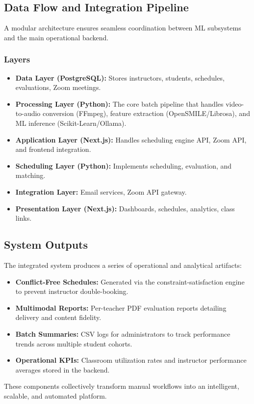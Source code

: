 \subsection{Data Flow and Integration Pipeline}

A modular architecture ensures seamless coordination between ML subsystems and the main operational backend.

\subsubsection*{Layers}
\begin{itemize}
    \item \textbf{Data Layer (PostgreSQL):} Stores instructors, students, schedules, evaluations, Zoom meetings.
    \item \textbf{Processing Layer (Python):} The core batch pipeline that handles video-to-audio conversion (FFmpeg), feature extraction (OpenSMILE/Librosa), and ML inference (Scikit-Learn/Ollama).
    \item \textbf{Application Layer (Next.js):}  
    Handles scheduling engine API, Zoom API, and frontend integration.
    \item \textbf{Scheduling Layer (Python):}  
    Implements scheduling, evaluation, and matching.
    \item \textbf{Integration Layer:}  
    Email services, Zoom API gateway.
    \item \textbf{Presentation Layer (Next.js):}  
    Dashboards, schedules, analytics, class links.
\end{itemize}

\subsection{System Outputs}
The integrated system produces a series of operational and analytical artifacts:
\begin{itemize}
    \item \textbf{Conflict-Free Schedules:} Generated via the constraint-satisfaction engine to prevent instructor double-booking.
    \item \textbf{Multimodal Reports:} Per-teacher PDF evaluation reports detailing delivery and content fidelity.
    \item \textbf{Batch Summaries:} CSV logs for administrators to track performance trends across multiple student cohorts.
    \item \textbf{Operational KPIs:} Classroom utilization rates and instructor performance averages stored in the backend.
\end{itemize}

These components collectively transform manual workflows into an intelligent, scalable, and automated platform.
